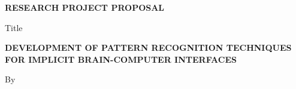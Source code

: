 \begin{titlepage}
\begin{center}


\begin{figure}[h!]
\centering
{}
\end{figure} 

\vspace{10 mm}
\vskip5.0in

\thispagestyle{empty}%

\begin{center}
		\textbf{RESEARCH PROJECT PROPOSAL}
\end{center}
\vspace{10 mm}
\begin{center}
		\Large{Title}
\end{center}

\begin{center}
		\Large\uppercase\expandafter{\textbf{Development of pattern recognition techniques for implicit brain-computer interfaces}}
\end{center}

\vspace{10 mm}

\begin{center}
		\Large{By}
\end{center}


\end{center}
\end{titlepage}

